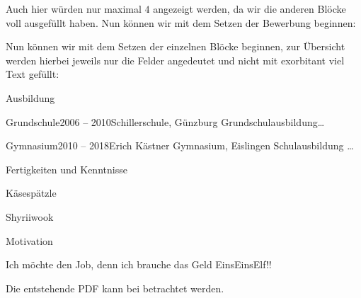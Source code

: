 Auch hier würden nur maximal $4$ angezeigt werden, da wir die anderen Blöcke voll ausgefüllt haben. Nun können wir mit dem Setzen der Bewerbung beginnen:
\begin{latex}[firstnumber=last]
\StartApplication
\end{latex}
Nun können wir mit dem Setzen der einzelnen Blöcke beginnen, zur Übersicht werden hierbei jeweils nur die Felder angedeutet und nicht mit exorbitant viel Text gefüllt:
\begin{latex}[firstnumber=last]
\begin{block}[\faGraduationCap]{Ausbildung}
    \begin{timeline}
        \begin{event}{Grundschule}{2006 -- 2010}{Schillerschule, Günzburg}
            Grundschulausbildung\ldots
        \end{event}
        \begin{event}{Gymnasium}{2010 -- 2018}{Erich Kästner Gymnasium, Eislingen}
            Schulausbildung \ldots
        \end{event}
    \end{timeline}
\end{block}
\begin{block}[\faTasks]{Fertigkeiten und Kenntnisse} %
    \begin{bulletpoints}[2]
        \item Käsespätzle 
        \item Shyriiwook 
    \end{bulletpoints}
\end{block}
\begin{block}[\faThumbsOUp]{Motivation}
    \begin{text}
        Ich möchte den Job, denn ich brauche das Geld EinsEinsElf!!%
    \end{text}
\end{block}
\end{latex}
\begin{example}
    Die entstehende PDF kann bei  betrachtet werden.
\end{example}
